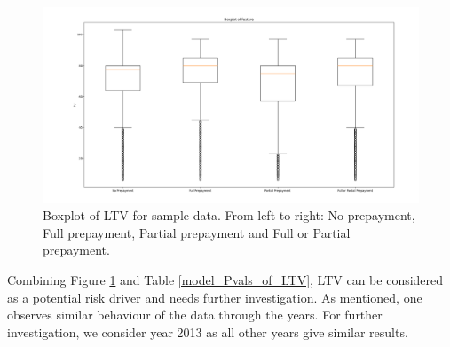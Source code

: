         \begin{figure}[H]
            \centering
            \includegraphics[width=\linewidth]{Latex/Report/Figures/Boxplot_of_ltv_[2013, 2014, 2015, 2016, 2017, 2018, 2019, 2020]_.png}
            \caption{Boxplot of LTV for sample data. From left to right: No prepayment, Full prepayment, Partial prepayment and Full or Partial prepayment.}
            \label{model_boxplot_LTV}
        \end{figure}
    
        \noindent
        Combining Figure \ref{model_boxplot_LTV} and Table \ref{model_Pvals_of_LTV}, LTV can be considered as a potential risk driver and needs further investigation. As mentioned, one observes similar behaviour of the data through the years. For further investigation, we consider year 2013 as all other years give similar results.  
    
